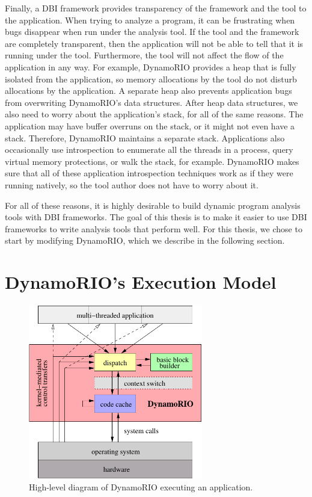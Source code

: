 Finally, a DBI framework provides transparency of the framework and the tool to
the application.  When trying to analyze a program, it can be frustrating when
bugs disappear when run under the analysis tool.  If the tool and the framework
are completely transparent, then the application will not be able to tell that
it is running under the tool.  Furthermore, the tool will not affect the flow
of the application in any way.  For example, DynamoRIO provides a heap that is
fully isolated from the application, so memory allocations by the tool do not
disturb allocations by the application.  A separate heap also prevents
application bugs from overwriting DynamoRIO's data structures.  After heap data
structures, we also need to worry about the application's stack, for all of the
same reasons.  The application may have buffer overruns on the stack, or it
might not even have a stack.  Therefore, DynamoRIO maintains a separate stack.
Applications also occasionally use introspection to enumerate all the threads
in a process, query virtual memory protections, or walk the stack, for example.
DynamoRIO makes sure that all of these application introspection techniques
work as if they were running natively, so the tool author does not have to
worry about it.

For all of these reasons, it is highly desirable to build dynamic program
analysis tools with DBI frameworks.  The goal of this thesis is to make it
easier to use DBI frameworks to write analysis tools that perform well.  For
this thesis, we chose to start by modifying DynamoRIO, which we describe in the
following section.

\section{DynamoRIO's Execution Model}

\begin{figure}
\begin{center}
\includegraphics[width=3in]{flow-highlevel.pdf}
\caption{High-level diagram of DynamoRIO executing an application.}
\end{center}
\end{figure}

